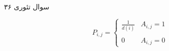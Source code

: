 سوال تئوری ۳۶

$$ P_{i,j} = \begin{cases}
\frac{1}{d(i)} & A_{i,j} = 1\\\\
0 & A_{i,j} = 0
\end{cases}
$$
